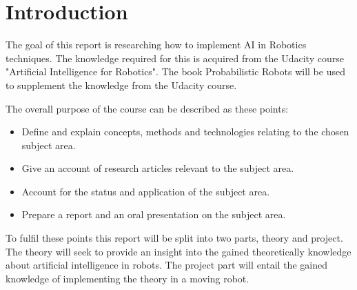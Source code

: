 \chapter{Introduction}
The goal of this report is researching how to implement AI in Robotics techniques. The knowledge required for this is acquired from the Udacity course "Artificial Intelligence for Robotics"\cite{AIROK}. The book Probabilistic Robots will be used to supplement the knowledge from the Udacity course\cite{thrun2005probabilistic}.

The overall purpose of the course can be described as these points:
\begin{itemize}
\item Define and explain concepts, methods and technologies relating to the chosen subject area.
\item Give an account of research articles relevant to the subject area.
\item Account for the status and application of the subject area.
\item Prepare a report and an oral presentation on the subject area.
\end{itemize}

To fulfil these points this report will be split into two parts, theory and project. The theory will seek to provide an insight into the gained theoretically knowledge about artificial intelligence in robots.
The project part will entail the gained knowledge of implementing the theory in a moving robot.
